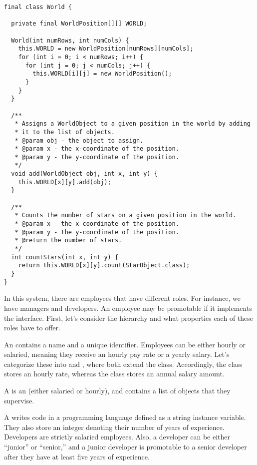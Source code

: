 \enlargethispage{-3\baselineskip}
\begin{lstlisting}[language=MyJava]
final class World {
  
  private final WorldPosition[][] WORLD;

  World(int numRows, int numCols) {
    this.WORLD = new WorldPosition[numRows][numCols];
    for (int i = 0; i < numRows; i++) {
      for (int j = 0; j < numCols; j++) {
        this.WORLD[i][j] = new WorldPosition();
      }
    }
  }

  /**
   * Assigns a WorldObject to a given position in the world by adding
   * it to the list of objects.
   * @param obj - the object to assign.
   * @param x - the x-coordinate of the position.
   * @param y - the y-coordinate of the position.
   */
  void add(WorldObject obj, int x, int y) {
    this.WORLD[x][y].add(obj);
  }

  /**
   * Counts the number of stars on a given position in the world.
   * @param x - the x-coordinate of the position.
   * @param y - the y-coordinate of the position.
   * @return the number of stars.
   */
  int countStars(int x, int y) {
    return this.WORLD[x][y].count(StarObject.class);
  }
}
\end{lstlisting}

In this system, there are employees that have different roles. 
For instance, we have managers and developers. 
An employee may be promotable if it implements the  interface. 
First, let's consider the hierarchy and what properties each of these roles have to offer.

An  contains a name and a unique identifier. 
Employees can be either hourly or salaried, meaning they receive an hourly pay rate or a yearly salary. 
Let's categorize these into  and , where both extend the  class. 
Accordingly, the  class stores an hourly rate, whereas the  class stores an annual salary amount.

A  is an  (either salaried or hourly), and contains a list of  objects that they supervise. 

A  writes code in a programming language defined as a string instance variable. 
They also store an integer denoting their number of years of experience. 
Developers are strictly salaried employees. 
Also, a developer can be either ``junior'' or ``senior,'' and a junior developer is promotable to a senior developer after they have at least five years of experience.

